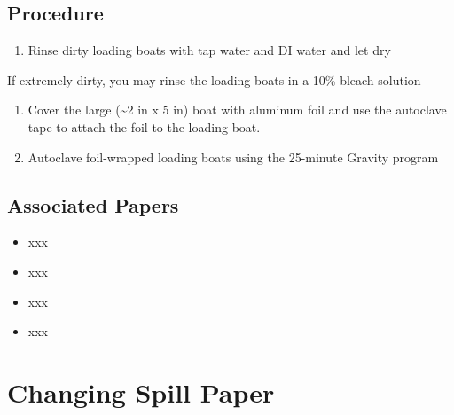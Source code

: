 \documentclass[
  letterpaper,
  DIV=11,
  numbers=noendperiod]{scrreprt}
\providecommand{\tightlist}{%
  \setlength{\itemsep}{0pt}\setlength{\parskip}{0pt}}\usepackage{longtable,booktabs,array}
\begin{document}
\hypertarget{procedure-5}{%
\section{Procedure}\label{procedure-5}}

\begin{enumerate}
\def\labelenumi{\arabic{enumi}.}
\tightlist
\item
  Rinse dirty loading boats with tap water and DI water and let dry
\end{enumerate}

\begin{tcolorbox}[enhanced jigsaw, toprule=.15mm, breakable, coltitle=black, leftrule=.75mm, title=\textcolor{quarto-callout-note-color}{\faInfo}\hspace{0.5em}{NOTE}, bottomrule=.15mm, toptitle=1mm, bottomtitle=1mm, colframe=quarto-callout-note-color-frame, opacityback=0, colback=white, opacitybacktitle=0.6, colbacktitle=quarto-callout-note-color!10!white, rightrule=.15mm, titlerule=0mm, arc=.35mm, left=2mm]

If extremely dirty, you may rinse the loading boats in a 10\% bleach
solution

\end{tcolorbox}

\begin{enumerate}
\def\labelenumi{\arabic{enumi}.}
\setcounter{enumi}{1}
\tightlist
\item
  Cover the large (\textasciitilde2 in x 5 in) boat with aluminum foil
  and use the autoclave tape to attach the foil to the loading boat.
\item
  Autoclave foil-wrapped loading boats using the 25-minute Gravity
  program
\end{enumerate}

\hypertarget{associated-papers-5}{%
\section{Associated Papers}\label{associated-papers-5}}

\begin{itemize}
\tightlist
\item
  xxx
\item
  xxx
\item
  xxx
\item
  xxx
\end{itemize}

\hypertarget{sec-general-spill_paper}{%
\chapter{Changing Spill Paper}\label{sec-general-spill_paper}}
\end{document}
